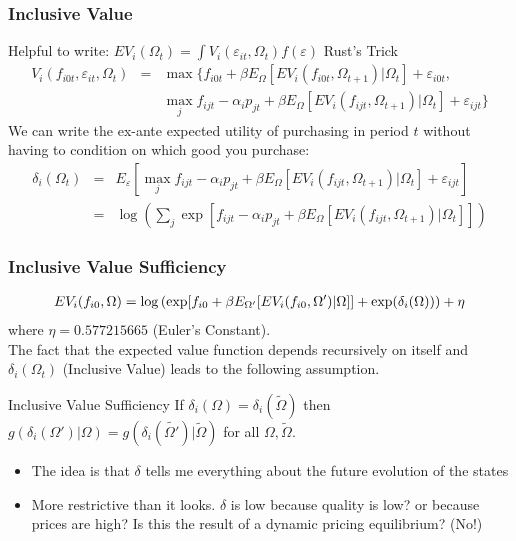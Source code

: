 \begin{frame}
\frametitle{Inclusive Value}
 Helpful to write: $EV_i(\Omega_t)= \int V_i(\varepsilon_{it},  \Omega_t)f(\varepsilon)$ \alert{Rust's Trick}
\begin{eqnarray*}
V_i(f_{i0t},\varepsilon_{i t}, \Omega_t) &=& \max \{ f_{i0t} + \beta E_{\Omega}[ EV_i (f_{i0t}, \Omega_{t+1}) |\Omega_{t} ] + \varepsilon_{i0t},\\
&& \max_j f_{ijt}  -\alpha_i p_{jt} + \beta E_{\Omega}[ E V_i (f_{ijt}, \Omega_{t+1}) |\Omega_{t}] + \varepsilon_{ijt}  \}
\end{eqnarray*}
We can write the \alert{ex-ante} expected utility of purchasing in period $t$ without having to condition on which good you purchase:
\begin{eqnarray*} 
\delta_{i}(\Omega_t) &=& E_{\varepsilon} [ \max_j f_{ijt}  -\alpha_i p_{jt} + \beta E_{\Omega}[ E V_i (f_{ijt}, \Omega_{t+1}) |\Omega_{t}] + \varepsilon_{ijt}]  \\
&=& \log \left( \sum_j \exp[ f_{ijt}  -\alpha_i p_{jt} + \beta E_{\Omega}[ E V_i (f_{ijt}, \Omega_{t+1}) |\Omega_{t}] ]  \right)
\end{eqnarray*}
\end{frame}

\begin{frame}
\frametitle{Inclusive Value Sufficiency}
\begin{eqnarray*}
\small EV_i(f_{i0}, \Omega) = \log\left( \exp[ f_{i0} + \beta E_{\Omega'}[ EV_i (f_{i0}, \Omega') |\Omega]] + \exp(\delta_i(\Omega))  \right) + \eta
\end{eqnarray*}
\footnotesize 
\alert{where $\eta = 0.577215665$ (Euler's Constant).}\\
\normalsize
The fact that the expected value function depends recursively on itself and $\delta_{i}(\Omega_t)$ (Inclusive Value) leads to the following assumption.
\begin{block}{Inclusive Value Sufficiency}
If $\delta_i(\Omega) = \delta_i(\tilde{\Omega})$ then $g(\delta_i(\Omega') | \Omega)= g(\delta_i(\tilde{\Omega'}) | \tilde{\Omega})$ for all $\Omega,\tilde{\Omega}$.
\end{block}
\begin{itemize}
\item The idea is that $\delta$ tells me everything about the future evolution of the states
\item More restrictive than it looks.  $\delta$ is low because quality is low? or because prices are high? Is this the result of a dynamic pricing equilibrium? (No!)
\end{itemize}
\end{frame}

